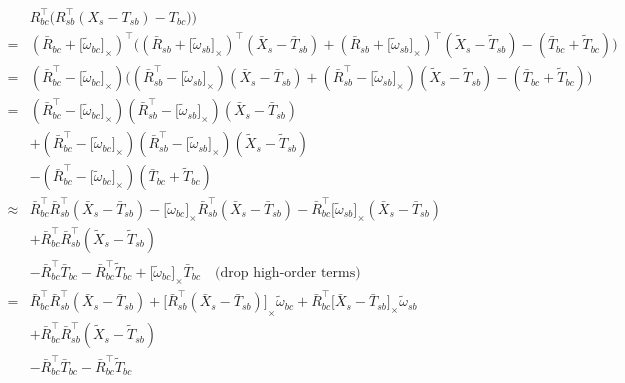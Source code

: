 \documentclass[letter,10pt]{article}
\newcommand{\asym}[1]{{\lbrack #1\rbrack}_\times{}}
\begin{document}
\begin{equation}
\begin{aligned}
 & R_{bc}^\top\big(R_{sb}^\top(X_s-T_{sb})-T_{bc})\big) \\
 = & (\bar R_{bc} + \asym{\tilde\omega_{bc}})^\top
 \big( (\bar R_{sb} + \asym{\tilde\omega_{sb}})^\top (\bar X_s - \bar T_{sb}) + (\bar R_{sb} + \asym{\tilde\omega_{sb}})^\top (\tilde X_s - \tilde T_{sb}) - (\bar T_{bc} + \tilde T_{bc}) \big) \\
 = & (\bar R_{bc}^\top - \asym{\tilde\omega_{bc}})
 \big( (\bar R_{sb}^\top - \asym{\tilde\omega_{sb}}) (\bar X_s - \bar T_{sb}) + (\bar R_{sb}^\top - \asym{\tilde\omega_{sb}}) (\tilde X_s - \tilde T_{sb}) - (\bar T_{bc} + \tilde T_{bc}) \big) \\
= & (\bar R_{bc}^\top - \asym{\tilde\omega_{bc}})
 (\bar R_{sb}^\top - \asym{\tilde\omega_{sb}}) (\bar X_s - \bar T_{sb}) \\
 &+ (\bar R_{bc}^\top - \asym{\tilde\omega_{bc}})(\bar R_{sb}^\top - \asym{\tilde\omega_{sb}}) (\tilde X_s - \tilde T_{sb}) \\
 &- (\bar R_{bc}^\top - \asym{\tilde\omega_{bc}})(\bar T_{bc} + \tilde T_{bc}) \\
 \approx & \bar R_{bc}^\top \bar R_{sb}^\top (\bar X_s - \bar T_{sb}) - \asym{\tilde \omega_{bc}}\bar R_{sb}^\top (\bar X_s - \bar T_{sb}) - \bar R_{bc}^\top \asym{\tilde \omega_{sb}}(\bar X_s - \bar T_{sb}) \\
 &+ \bar R_{bc}^\top\bar R_{sb}^\top (\tilde X_s - \tilde T_{sb}) \\
 &- \bar R_{bc}^\top \bar T_{bc} - \bar R_{bc}^\top \tilde T_{bc} + \asym{\tilde \omega_{bc}} \bar T_{bc} \quad\text{(drop high-order terms)}\\
 = & \bar R_{bc}^\top \bar R_{sb}^\top (\bar X_s - \bar T_{sb}) 
 + \asym{\bar R_{sb}^\top (\bar X_s - \bar T_{sb})}\tilde \omega_{bc} 
 + \bar R_{bc}^\top \asym{\bar X_s - \bar T_{sb}} \tilde \omega_{sb} \\
 &+ \bar R_{bc}^\top\bar R_{sb}^\top (\tilde X_s - \tilde T_{sb}) \\
 &- \bar R_{bc}^\top \bar T_{bc} 
 - \bar R_{bc}^\top \tilde T_{bc} 

\end{aligned}
\end{equation}
\end{document}
